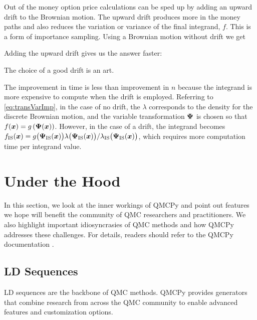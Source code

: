 \documentclass[graybox,footinfo]{svmult}
\newcommand{\IMP}{\textup{IS}}
\begin{document}
Out of the money option price calculations can be sped up by adding an upward drift to the Brownian motion.  The upward drift produces more in the money paths and also reduces the variation or variance of the final integrand, $f$.  This is a form of importance sampling.  Using a Brownian motion without drift we get

Adding the upward drift gives us the answer faster:

The choice of a good drift is an art.  

The improvement in time is less than improvement in $n$ because the integrand is more expensive to compute when the drift is employed.  Referring to \eqref{eq:transVarImp}, in the case of no drift, the $\lambda$ corresponds to the density for the discrete Brownian motion, and the variable transformation ${\boldsymbol{\Psi}}$ is chosen so that $f({\boldsymbol{x}}) = g\left({\boldsymbol{\Psi}}({\boldsymbol{x}}) \right)$.  However, in the case of a drift, the integrand becomes  $f_\IMP(\bsx)  = g\bigl(\bsPsi_\IMP(\bsx)\bigr)  \lambda\bigl(\bsPsi_\IMP(\bsx)\bigr)/\lambda_\IMP\bigl(\bsPsi_\IMP(\bsx)\bigr)$, which requires more computation time per integrand value. 

\section{Under the Hood}

In this section, we look at the inner workings of QMCPy and point out features we hope will benefit the community of QMC researchers and practitioners. We also highlight important idiosyncrasies of QMC methods and how QMCPy addresses these challenges. For details, readers should refer to the QMCPy documentation \cite{QMCPyDocs}.

\subsection{LD Sequences}

LD sequences are the backbone of QMC methods. QMCPy provides generators that combine research from across the QMC community to enable advanced features and customization options.
\end{document}
